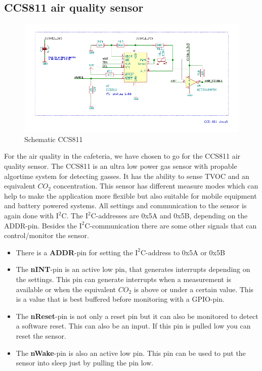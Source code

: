 \documentclass[11pt,a4paper]{article}
\begin{document}
\subsection{CCS811 air quality sensor}
\begin{figure}[H]
	\centering
	\includegraphics[width=0.8\linewidth]{Schematic CCS811.png}
	\caption{Schematic CCS811}
	\label{fig:CCS811}
\end{figure}
For the air quality in the cafeteria, we have chosen to go for the CCS811 air quality sensor. The CCS811 is an ultra low power gas sensor with propable algortime system for detecting gasses. It has the ability to sense TVOC and an equivalent $CO_{2}$ concentration. This sensor has different measure modes which can help to make the application more flexible but also suitable for mobile equipment and battery powered systems. All settings and communication to the sensor is again done with $\text{I}^2$C. The $\text{I}^2$C-addresses are 0x5A and 0x5B, depending on the ADDR-pin. Besides the $\text{I}^2$C-communication there are some other signals that can control/monitor the sensor. 
\begin{itemize}
	\item There is a \textbf{ADDR}-pin for setting the $\text{I}^2$C-address to 0x5A or 0x5B
	\item The\textbf{ nINT}-pin is an active low pin, that generates interrupts depending on the settings. This pin can generate interrupts when a measurement is available or when the equivalent $CO_{2}$ is above or under a certain value. This is a value that is best buffered before monitoring with a GPIO-pin.
	\item The \textbf{nReset}-pin is not only a reset pin but it can also be monitored to detect a software reset. This can also be an input. If this pin is pulled low you can reset the sensor.
	\item The \textbf{nWake}-pin is also an active low pin. This pin can be used to put the sensor into sleep just by pulling the pin low.
\end{itemize}
\end{document}
